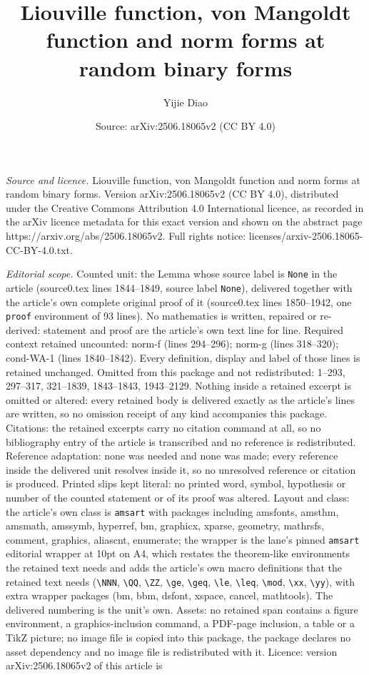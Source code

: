 \documentclass[10pt,a4paper]{amsart}
\title[Liouville function, von Mangoldt function and norm forms at ]{Liouville function, von Mangoldt function and norm forms at random binary forms}
\author{Yijie Diao}
\date{Source: arXiv:2506.18065v2 (CC BY 4.0)}
\begin{document}
\maketitle

\noindent\emph{Source and licence.} Liouville function, von Mangoldt function and norm forms at random binary forms. Version arXiv:2506.18065v2 (CC BY 4.0), distributed under the Creative Commons Attribution 4.0 International licence, as recorded in the arXiv licence metadata for this exact version and shown on the abstract page https://arxiv.org/abs/2506.18065v2. Full rights notice: licenses/arxiv-2506.18065-CC-BY-4.0.txt.\par\smallskip

\noindent\textit{Editorial scope.} Counted unit: the Lemma whose source label is \texttt{None} in the article (source0.tex lines 1844--1849, source label \texttt{None}), delivered together with the article's own complete original proof of it (source0.tex lines 1850--1942, one \texttt{proof} environment of 93 lines). No mathematics is written, repaired or re-derived: statement and proof are the article's own text line for line. Required context retained uncounted: norm-f (lines 294--296); norm-g (lines 318--320); cond-WA-1 (lines 1840--1842). Every definition, display and label of those lines is retained unchanged. Omitted from this package and not redistributed: 1--293, 297--317, 321--1839, 1843--1843, 1943--2129. Nothing inside a retained excerpt is omitted or altered: every retained body is delivered exactly as the article's lines are written, so no omission receipt of any kind accompanies this package. Citations: the retained excerpts carry no citation command at all, so no bibliography entry of the article is transcribed and no reference is redistributed. Reference adaptation: none was needed and none was made; every reference inside the delivered unit resolves inside it, so no unresolved reference or citation is produced. Printed slips kept literal: no printed word, symbol, hypothesis or number of the counted statement or of its proof was altered. Layout and class: the article's own class is \texttt{amsart} with packages including amsfonts, amsthm, amsmath, amssymb, hyperref, bm, graphicx, xparse, geometry, mathrsfs, comment, graphics, aliascnt, enumerate; the wrapper is the lane's pinned \texttt{amsart} editorial wrapper at 10pt on A4, which restates the theorem-like environments the retained text needs and adds the article's own macro definitions that the retained text needs (\texttt{\textbackslash NNN}, \texttt{\textbackslash QQ}, \texttt{\textbackslash ZZ}, \texttt{\textbackslash ge}, \texttt{\textbackslash geq}, \texttt{\textbackslash le}, \texttt{\textbackslash leq}, \texttt{\textbackslash mod}, \texttt{\textbackslash xx}, \texttt{\textbackslash yy}), with extra wrapper packages (bm, bbm, dsfont, xspace, cancel, mathtools). The delivered numbering is the unit's own. Assets: no retained span contains a figure environment, a graphics-inclusion command, a PDF-page inclusion, a table or a TikZ picture; no image file is copied into this package, the package declares no asset dependency and no image file is redistributed with it. Licence: version arXiv:2506.18065v2 of this article is 
\end{document}
